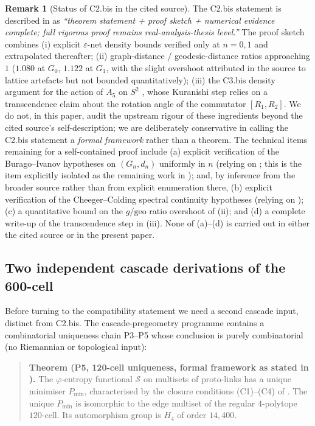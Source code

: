 \documentclass[11pt, a4paper]{amsart}
\theoremstyle{definition}
\newtheorem{remark}[theorem]{Remark}
\begin{document}
\begin{remark}[Status of C2.bis in the cited source]
\label{rmk:c2bis-status}
The C2.bis statement is described in \cite[\S C2.bis]{CascadeGR} as
\emph{``theorem statement + proof sketch + numerical evidence
complete; full rigorous proof remains real-analysis-thesis level.''}
The proof sketch combines (i) explicit $\varepsilon$-net density
bounds verified only at $n = 0, 1$ and extrapolated thereafter;
(ii) graph-distance / geodesic-distance ratios approaching $1$
($1.080$ at $G_{0}$, $1.122$ at $G_{1}$, with the slight overshoot
attributed in the source to lattice artefacts but not bounded
quantitatively); (iii) the C3.bis density argument for the action
of $A_{5}$ on $S^{2}$ \cite[\S C3.bis]{CascadeGR}, whose Kuranishi
step relies on a transcendence claim about the rotation angle of
the commutator $[R_{1}, R_{2}]$. We do not, in this paper, audit
the upstream rigour of these ingredients beyond the cited source's
self-description; we are deliberately conservative in calling the
C2.bis statement a \emph{formal framework} rather than a theorem.
The technical items remaining for a self-contained proof include
(a) explicit verification of the Burago--Ivanov hypotheses on
$(G_{n}, d_{n})$ uniformly in $n$ (relying on
\cite{BuragoBuragoIvanov}; this is the item explicitly isolated as
the remaining work in \cite[\S C2.bis.5]{CascadeGR}); and, by
inference from the broader source rather than from explicit
enumeration there, (b) explicit verification of the
Cheeger--Colding spectral continuity hypotheses (relying on
\cite{CheegerColding1997}); (c) a quantitative bound on the
$g/\mathrm{geo}$ ratio overshoot of (ii); and (d) a complete
write-up of the transcendence step in (iii). None of (a)--(d) is
carried out in either the cited source or in the present paper.
\end{remark}

\subsection{Two independent cascade derivations of the 600-cell}
\label{subsec:two-derivations}

Before turning to the compatibility statement we need a second
cascade input, distinct from C2.bis. The cascade-pregeometry programme
\cite{CascadePregeometry} contains a combinatorial uniqueness chain
P3--P5 whose conclusion is purely combinatorial (no Riemannian or
topological input):

\begin{quote}
\textbf{Theorem (P5, 120-cell uniqueness, formal framework as stated
in \cite[\S P5]{CascadePregeometry}).} The $\varphi$-entropy
functional $\mathcal{S}$ on multisets of proto-links has a unique
minimiser $P_{\min}$, characterised by the closure conditions
(C1)--(C4) of \cite[\S P5.2]{CascadePregeometry}. The unique
$P_{\min}$ is isomorphic to the edge multiset of the regular
$4$-polytope $120$-cell. Its automorphism group is $H_{4}$ of order
$14{,}400$.
\end{quote}
\end{document}
